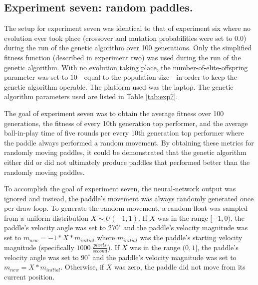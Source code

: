 \documentclass[a4paper,10pt]{article}
\begin{document}
\subsection{Experiment seven: random paddles.} 


The setup for experiment seven was identical to that of experiment six where no evolution ever took place (crossover and mutation probabilities were set to $0.0$) during the run of the genetic algorithm over 100 generations. Only the simplified fitness function (described in experiment two) was used during the run of the genetic algorithm. With no evolution taking place, the number-of-elite-offspring parameter was set to $10$---equal to the population size---in order to keep the genetic algorithm operable. The platform used was the laptop. The genetic algorithm parameters used are listed in Table \ref{tab:exp7}. 

The goal of experiment seven was to obtain the average fitness over 100 generations, the fitness of every 10th generation top performer, and the average ball-in-play time of five rounds per every 10th generation top performer where the paddle always performed a random movement. By obtaining these metrics for randomly moving paddles, it could be demonstrated that the genetic algorithm either did or did not ultimately produce paddles that performed better than the randomly moving paddles. 

To accomplish the goal of experiment seven, the neural-network output was ignored and instead, the paddle's movement was always randomly generated once per draw loop. To generate the random movement, a random float was sampled from a uniform distribution $X\sim U(-1,1)$. If $X$ was in the range $[-1,0)$, the paddle's velocity angle was set to $270^\circ$ and the paddle's velocity magnitude was set to $m_{new} = -1 * X * m_{initial}$ where $m_{initial}$ was the paddle's starting velocity magnitude (specifically $1000 \ \frac{pixels}{second}$). If $X$ was in the range $(0,1]$, the paddle's velocity angle was set to $90^\circ$ and the paddle's velocity magnitude was set to $m_{new} = X * m_{initial}$. Otherwise, if $X$ was zero, the paddle did not move from its current position. 
\end{document}
